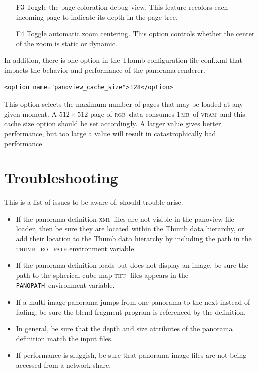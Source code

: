 \documentclass[oneside,11pt]{memoir}
\newcommand{\tiff}    {\textsc{tiff}}
\newcommand{\xml}     {\textsc{xml}}
\newcommand{\panopath}{\texttt{PANOPATH}}
\newcommand{\rgb}     {\textsc{rgb}}
\newcommand{\mb}    {\,\textsc{mb}}
\newcommand{\vram}    {\textsc{vram}}
\begin{document}
\begin{Spacing}{1.1}
\begin{itemize}
\item[F3] Toggle the page coloration debug view. This feature recolors each incoming page to indicate its depth in the page tree.

\item[F4] Toggle automatic zoom centering. This option controls whether the center of the zoom is static or dynamic.
\end{itemize}

In addition, there is one option in the Thumb configuration file conf.xml that impacts the behavior and performance of the panorama renderer.


\begin{verbatim}
<option name="panoview_cache_size">128</option>
\end{verbatim}

This option selects the maximum number of pages that may be loaded at any given moment. A $512\times 512$ page of \rgb\ data consumes 1\mb\ of \vram\, and this cache size option should be set accordingly. A larger value gives better performance, but too large a value will result in catastrophically bad performance.

\section{Troubleshooting}

This is a list of issues to be aware of, should trouble arise.

\begin{itemize}
\item If the panorama definition \xml\ files are not visible in the panoview file loader, then be sure they are located within the Thumb data hierarchy, or add their location to the Thumb data hierarchy by including the path in the \textsc{thumb\_ro\_path} environment variable.

\item If the panorama definition loads but does not display an image, be sure the path to the spherical cube map \tiff\ files appears in the \panopath\ environment variable.

\item If a multi-image panorama jumps from one panorama to the next instead of fading, be sure the blend fragment program is referenced by the definition.

\item In general, be sure that the depth and size attributes of the panorama definition match the input files.

\item If performance is sluggish, be sure that panorama image files are not being accessed from a network share.
\end{itemize}

\printpagenotes
\end{Spacing}
\end{document}
